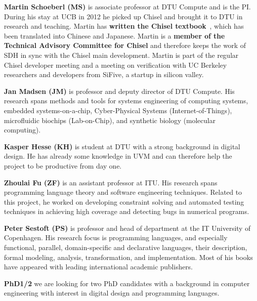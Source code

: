 \documentclass[fleqn,12pt]{article}
\begin{document}
{\bf Martin Schoeberl (MS)} is associate professor at DTU Compute and is the PI.
During his stay
at UCB in 2012 he picked up Chisel and brought it to DTU in research and teaching.
Martin has {\bf written the Chisel textbook}~\cite{chisel:book}, which has been translated
into Chinese and Japanese. Martin is a {\bf member of the Technical Advisory Committee for
Chisel} and therefore keeps the work of SDH in sync with the Chisel main development.
Martin is part of the regular Chisel developer meeting and a meeting on verification with
UC Berkeley researchers and developers from SiFive, a startup in silicon valley.


{\bf Jan Madsen (JM)} is professor and deputy director of DTU Compute.
His research spans methods
and tools for systems engineering of computing systems, embedded systems-on-a-chip,
Cyber-Physical Systems (Internet-of-Things), microfluidic biochips (Lab-on-Chip), and
synthetic biology (molecular computing). 

{\bf Kasper Hesse (KH)} is student at DTU with a strong background in digital design.
He has already some knowledge in UVM and can therefore help the project to be productive
from day one.

{\bf Zhoulai Fu (ZF)} is an assistant professor at ITU. His research
spans programming language theory and software engineering
techniques. Related to this project, he worked on developing
constraint solving and automated testing techniques in achieving high
coverage and detecting bugs in numerical programs.

{\bf Peter Sestoft (PS)} is professor and head of department at the IT University of Copenhagen.
His research focus is programming languages, and especially functional, parallel, domain-specific
and declarative languages, their description, formal modeling, analysis, transformation, and implementation.
Most of his books have appeared with leading international academic publishers.

{\bf PhD1/2} we are looking for two PhD candidates with a background in computer engineering
with interest in digital design and programming languages.

%
\end{document}
